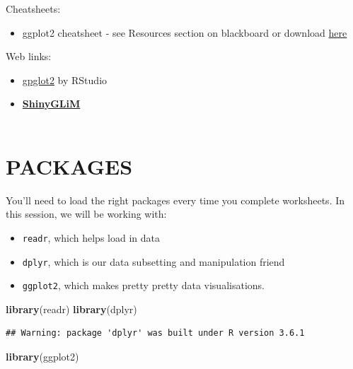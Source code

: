\documentclass[
]{book}
\newenvironment{Shaded}{\begin{snugshade}}{\end{snugshade}}
\newcommand{\KeywordTok}[1]{\textcolor[rgb]{0.13,0.29,0.53}{\textbf{#1}}}
\newcommand{\NormalTok}[1]{#1}
\providecommand{\tightlist}{%
  \setlength{\itemsep}{0pt}\setlength{\parskip}{0pt}}
\begin{document}
Cheatsheets:

\begin{itemize}
\tightlist
\item
  ggplot2 cheatsheet - see Resources section on blackboard or
  download \href{https://rstudio.com/wp-content/uploads/2015/03/ggplot2-cheatsheet.pdf}{here}
  ~
\end{itemize}

Web links:

\begin{itemize}
\item
  \href{https://ggplot2.tidyverse.org/}{gpglot2} by RStudio\\
  \hspace*{0.333em}
\item
  \href{https://iainmstott.shinyapps.io/ShinyGLiM}{\textbf{ShinyGLiM}}\\
  ~\\
\end{itemize}

\hypertarget{packages}{%
\section{PACKAGES}\label{packages}}

You'll need to load the right packages every time you complete worksheets. In
this session, we will be working with:

\begin{itemize}
\tightlist
\item
  \texttt{readr}, which helps load in data
\item
  \texttt{dplyr}, which is our data subsetting and manipulation friend
\item
  \texttt{ggplot2}, which makes pretty pretty data visualisations.
\end{itemize}

\begin{Shaded}
\begin{Highlighting}[]
\KeywordTok{library}\NormalTok{(readr)}
\KeywordTok{library}\NormalTok{(dplyr)}
\end{Highlighting}
\end{Shaded}

\begin{verbatim}
## Warning: package 'dplyr' was built under R version 3.6.1
\end{verbatim}

\begin{Shaded}
\begin{Highlighting}[]
\KeywordTok{library}\NormalTok{(ggplot2)}
\end{Highlighting}
\end{Shaded}
\end{document}
